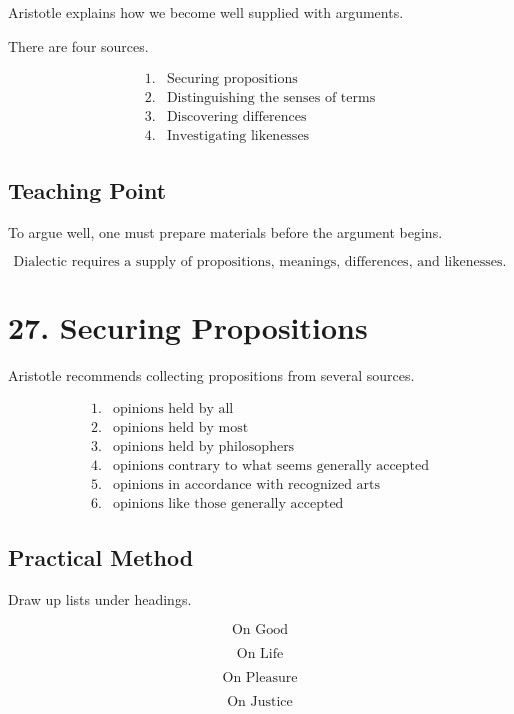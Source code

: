 \documentclass[12pt]{article}
\begin{document}
Aristotle explains how we become well supplied with arguments.

There are four sources.

\[
\begin{array}{ll}
1. & \text{Securing propositions} \\
2. & \text{Distinguishing the senses of terms} \\
3. & \text{Discovering differences} \\
4. & \text{Investigating likenesses}
\end{array}
\]

\subsection*{Teaching Point}

To argue well, one must prepare materials before the argument begins.

\[
\boxed{
\text{Dialectic requires a supply of propositions, meanings, differences, and likenesses.}
}
\]

\section*{27. Securing Propositions}

Aristotle recommends collecting propositions from several sources.

\[
\begin{array}{ll}
1. & \text{opinions held by all} \\
2. & \text{opinions held by most} \\
3. & \text{opinions held by philosophers} \\
4. & \text{opinions contrary to what seems generally accepted} \\
5. & \text{opinions in accordance with recognized arts} \\
6. & \text{opinions like those generally accepted}
\end{array}
\]

\subsection*{Practical Method}

Draw up lists under headings.

\[
\text{On Good}
\]

\[
\text{On Life}
\]

\[
\text{On Pleasure}
\]

\[
\text{On Justice}
\]
\end{document}

